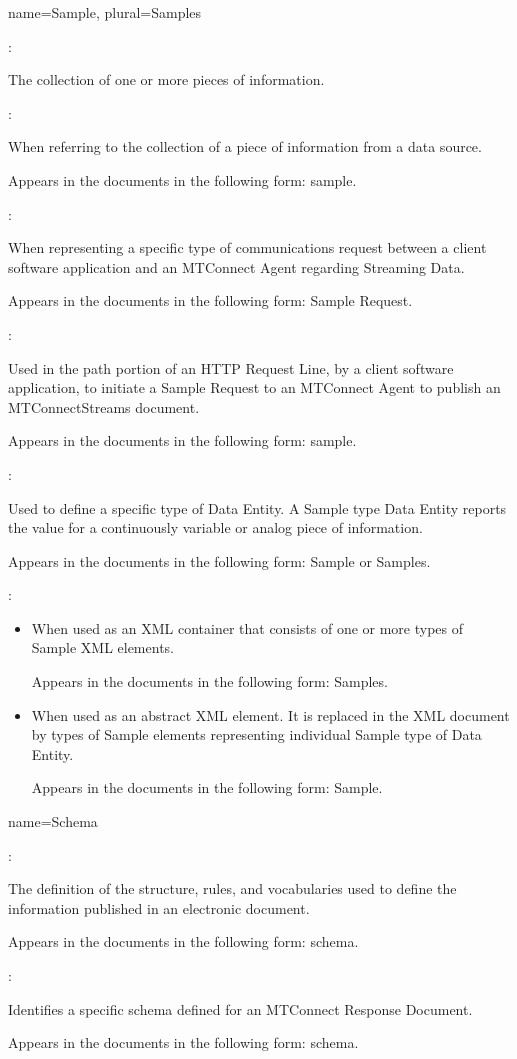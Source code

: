 {
  name={Sample},
  plural={Samples}
}
{
	:

	The collection of one or more pieces of information.  

	:

	When referring to the collection of a piece of information from a data source.

	Appears in the documents in the following form: sample.

	:

	When representing a specific type of communications request between a client software application and an MTConnect Agent regarding Streaming Data.  

	Appears in the documents in the following form: Sample Request.

	:

	Used in the path portion of an HTTP Request Line, by a client software application, to initiate a Sample Request to an MTConnect Agent to publish an MTConnectStreams document.

	Appears in the documents in the following form: sample.

	:

	Used to define a specific type of Data Entity.  A Sample type Data Entity reports the value for a continuously variable or analog piece of information.

	Appears in the documents in the following form: Sample or Samples.

	:

    \begin{itemize}
	\item When used as an XML container that consists of one or more types of Sample XML elements.

	Appears in the documents in the following form: Samples.

	\item When used as an abstract XML element.  It is replaced in the XML document by types of Sample elements representing individual Sample type of Data Entity.

	Appears in the documents in the following form: Sample.
    \end{itemize}
}


{
  name={Schema}
}
{
	:

	The definition of the structure, rules, and vocabularies used to define the information published in an electronic document.

	Appears in the documents in the following form: schema.

	:

	Identifies a specific schema defined for an MTConnect Response Document.

	Appears in the documents in the following form: schema.
}


